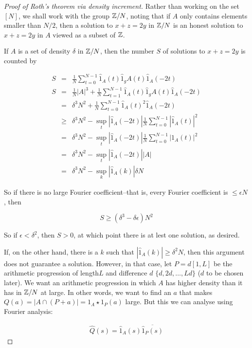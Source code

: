 \documentclass{article}
\theoremstyle{definition}
\theoremstyle{remark}
\numberwithin{equation}{section}
\begin{document}
\begin{proof}[Proof of Roth's theorem via density increment]

  Rather than working on the set $[N]$, we shall work with the group
  $\mathbb{Z}/N$, noting that if $A$ only contains elements smaller than
  $N/2$, then a solution to $x+z=2y$ in $\mathbb{Z}/N$ is an honest solution
  to $x+z=2y$ in $A$ viewed as a subset of $\mathbb{Z}$.  

  If $A$ is a set of density $\delta$ in $\mathbb{Z}/N$, then the number $S$
  of solutions to $x+z=2y$ is counted by

  \begin{eqnarray*}
    S &=& \frac1N \sum_{t=0}^{N-1} \hat 1_A(t)\hat 1_gA(t)\hat 1_A(-2t) \\
    S &=& \frac1N |A|^3 + \frac1N \sum_{t=1}^{N-1} \hat 1_A(t)\hat 1_gA(t)\hat 1_A(-2t) \\
      &=& \delta^3 N^2 + \frac1N \sum_{t=0}^{N-1} \hat 1_A(t)^2\hat 1_A(-2t) \\
      &\geq& \delta^3 N^2 - \sup_t |\hat 1_A(-2t)| \frac1N \sum_{t=0}^{N-1} |\hat 1_A(t)|^2 \\
      &=& \delta^3 N^2 - \sup_t |\hat 1_A(-2t)| \frac1N \sum_{t=0}^{N-1} |1_A(t)|^2 \\
      &=& \delta^3 N^2 - \sup_t |\hat 1_A(-2t)| |A|\\
      &=& \delta^3 N^2 - \sup_k |\hat 1_A(k)| \delta N
  \end{eqnarray*}

  So if there is no large Fourier coefficient--that is, every Fourier
  coefficient is $\leq \epsilon N$, then
  
  \[S \geq (\delta^3 - \delta\epsilon) N^2\]

  So if $\epsilon < \delta^2$, then $S > 0$, at which point there is at
  lest one solution, as desired.  
  
  If, on the other hand, there is a $k$ such that
  $|\hat 1_A(k)| \geq \delta^2 N$, then this argument does not
  guarantee a solution.  However, in that case, let $P = d[1,L]$ be
  the arithmetic progression of length$L$ and difference $d$
  $\{d, 2d, \ldots ,Ld\}$ ($d$ to be chosen later).  We want an
  arithmetic progression in which $A$ has higher density than it has
  in $\mathbb{Z}/N$ at large.  In other words, we want to find an $a$ that
  makes $Q(a) = |A \cap (P+a)| = 1_A \star 1_P(a)$ large.  But this we
  can analyse using Fourier analysis:
  
  \begin{eqnarray*}
    \hat Q(s) = \hat 1_A(s) \overline{\hat 1_P(s)}
  \end{eqnarray*}
  

\end{proof}
\end{document}
